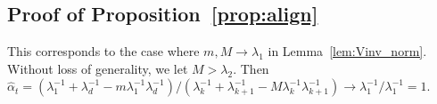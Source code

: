 %
%
%
%
\endproof



\subsection{Proof of Proposition~\ref{prop:align}}
\label{proof:align}
	This corresponds to the case where $m, M \to \lambda_1$ in Lemma~\ref{lem:Vinv_norm}.
	Without loss of generality, we let $M>\lambda_2$. Then
	$
	\hat{\alpha}_t  =(\lambda_{1}^{-1} + \lambda_{d}^{-1}   - m{\lambda_{1}^{-1}\lambda_{d}^{-1} })/(\lambda_{k}^{-1} +  \lambda_{k+1}^{-1}   - {M}{\lambda_{k}^{-1}\lambda_{k+1}^{-1} } ) \to \lambda_{1}^{-1}/\lambda_{1}^{-1} = 1
	$.\Halmos 
\endproof



















